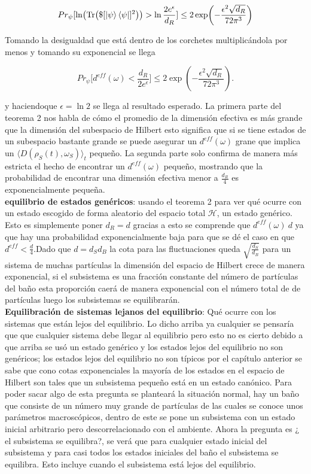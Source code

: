 \begin{equation}
Pr_{\psi} [ \ln (\Tr( \$ [\ket{\psi}\bra{\psi}]^{2})) > \ln \frac{2e^{\epsilon}}{d_{R}}  ] \leq 2\exp(-\frac{\epsilon^{2}\sqrt{d_{R}}}{72\pi^{3}})

\end{equation}

Tomando la desigualdad que está dentro de los corchetes  multiplicándola por menos y tomando su exponencial se llega

\begin{equation}
Pr_{\psi} \Big [  d^{eff}(\omega) < \frac{d_{R}}{2e^{\epsilon}} \Big ] \leq 2\exp(-\frac{\epsilon^{2}\sqrt{d_{R}}}{72\pi^{3}}).
\end{equation}

y haciendoque $\epsilon=\ln 2$ se llega al resultado esperado.
La primera parte del teorema 2 nos habla de cómo el promedio de la dimensión efectiva es más grande que la dimensión del subespacio de Hilbert esto significa que si se tiene estados de un subespacio bastante grande se puede asegurar un $d^{eff}(\omega)$ grane que implica un $\langle D(\rho_{S}(t) ,\omega_{S}) \rangle_{t}$ pequeño. La segunda parte solo confirma de manera más estricta el hecho de encontrar un $d^{eff}(\omega)$ pequeño, mostrando que la probabilidad de encontrar una dimensión efectiva menor a $\frac{d_{R}}{4}$ es exponencialmente pequeña.\\
\textbf{equilibrio de estados genéricos}:
usando el teorema 2 para ver qué ocurre con un estado escogido de forma aleatorio del espacio total $\mathcal{H}$, un estado genérico. Esto es simplemente poner $d_{R}=d$ gracias a esto se comprende que $d^{eff}(\omega)~d$ ya que  hay una probabilidad exponencialmente baja para que se dé  el caso en que $d^{eff} < \frac{d}{4}$.Dado que $d=d_{S}d_{B}$ la cota para las fluctuaciones queda $\sqrt{\frac{d_{S}}{d_{B}}}$ para un sistema de muchas partículas la dimensión del espacio de Hilbert crece de manera exponencial, si el subsistema es una fracción constante del número de partículas del baño esta proporción caerá de manera exponencial con el número total de de partículas luego los subsistemas se equilibrarán.\\
\textbf{Equilibración de sistemas lejanos del equilibrio}:
Qué ocurre con los sistemas que están lejos del equilibrio. Lo dicho arriba ya cualquier se pensaría que  que cualquier sistema debe llegar al equilibrio pero esto no es cierto debido a que arriba se usó un estado genérico y los estados lejos del equilibrio no son genéricos; los estados lejos del equilibrio no son típicos por el capítulo anterior se sabe que cono cotas exponenciales la mayoría de los estados en el espacio de Hilbert son tales que un subsistema pequeño está en un estado canónico. Para poder sacar algo de esta pregunta se planteará la situación normal, hay un baño que consiste de un número muy grande de partículas de las cuales se conoce unos parámetros macroscópicos, dentro de este se pone un subsistema con un estado inicial arbitrario pero descorrelacionado con el ambiente. Ahora la pregunta es ¿ el subsistema se equilibra?, se verá que para cualquier estado inicial del subsistema y para casi todos los estados iniciales del baño el subsistema se equilibra. Esto incluye cuando el subsistema está lejos del equilibrio.
